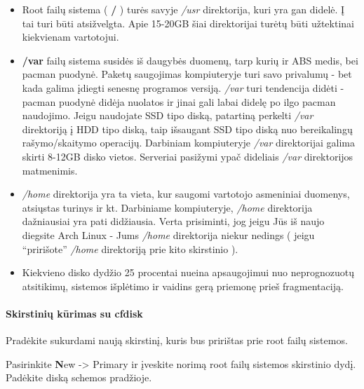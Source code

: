 \begin{itemize}
  \item Root failų sistema ( \textbf{/} ) turės savyje \textsl{/usr}
    direktorija, kuri yra gan didelė. Į tai turi būti
    atsižvelgta. Apie 15-20GB šiai direktorijai turėtų būti užtektinai
    kiekvienam vartotojui.
  \item \textbf{/var} failų sistema susidės iš daugybės duomenų, tarp
    kurių ir ABS medis, bei pacman puodynė. Paketų saugojimas
    kompiuteryje turi savo privalumų - bet kada galima įdiegti senesnę
    programos versiją. \textsl{/var} turi tendencija didėti - pacman
    puodynė didėja nuolatos ir jinai gali labai didelę po ilgo pacman
    naudojimo. Jeigu naudojate SSD tipo diską, patartiną perkelti
    \textsl{/var} direktoriją į HDD tipo diską, taip išsaugant SSD
    tipo diską nuo bereikalingų rašymo/skaitymo operacijų. Darbiniam
    kompiuteryje \textsl{/var} direktorijai galima skirti 8-12GB disko
    vietos. Serveriai pasižymi ypač dideliais \textsl{/var}
    direktorijos matmenimis.
  \item \textsl{/home} direktorija yra ta vieta, kur saugomi vartotojo
    asmeniniai duomenys, atsiųstas turinys ir kt. Darbiniame
    kompiuteryje, \textsl{/home} direktorija dažniausiai yra pati
    didžiausia. Verta prisiminti, jog jeigu Jūs iš naujo diegsite Arch
    Linux - Jums \textsl{/home} direktorija niekur nedings ( jeigu
    ``pririšote'' \textsl{/home} direktoriją prie kito skirstinio ).
  \item Kiekvieno disko dydžio 25 procentai nueina apsaugojimui nuo
    neprognozuotų atsitikimų, sistemos išplėtimo ir vaidins gerą
    priemonę prieš fragmentaciją.
\end{itemize}

\paragraph{Skirstinių kūrimas su cfdisk}

Pradėkite sukurdami naują skirstinį, kuris bus pririštas prie root
failų sistemos.

Pasirinkite \textbf{N}ew -> Primary ir įveskite norimą root failų
sistemos skirstinio dydį. Padėkite diską schemos pradžioje.
